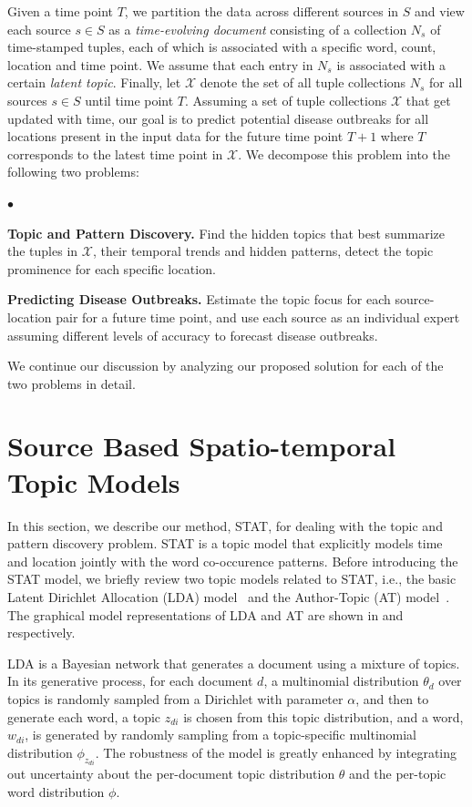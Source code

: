 \documentclass[conference]{IEEEtran}
\newcommand{\squishlist}{
   \begin{list}{$\bullet$}
    {
      \setlength{\itemsep}{0pt}
      \setlength{\parsep}{3pt}
      \setlength{\topsep}{3pt}
      \setlength{\partopsep}{0pt}
      \setlength{\leftmargin}{1.5em}
      \setlength{\labelwidth}{1em}
      \setlength{\labelsep}{0.5em} } }
\newcommand{\squishend}{
    \end{list}  }
\newcommand{\model}{{STAT}\xspace} %
\begin{document}
Given a time point $T$, we partition the data across different sources in $S$ and view each source $s \in S$ as a {\em time-evolving document} consisting of a collection $N_s$ of time-stamped tuples, each of which is associated with a specific word, count, location and time point. We assume that each entry in $N_s$ is associated with a certain {\em latent topic}. Finally, let $\mathcal{X}$ denote the set of all tuple collections $N_s$ for all sources $s \in S$ until time point $T$. Assuming a set of tuple collections $\mathcal{X}$ that get updated with time, our goal is to predict potential disease outbreaks for all locations present in the input data for the future time point $T+1$ where $T$ corresponds to the latest time point in $\mathcal{X}$.  We decompose this problem into the following two problems:
\squishlist
\item {\bf Topic and Pattern Discovery.} Find the hidden topics that best summarize the tuples in $\mathcal{X}$, their temporal trends and hidden patterns, detect the topic prominence for each specific location.
\item {\bf Predicting Disease Outbreaks.} Estimate the topic focus for each source-location pair for a future time point, and use each source as an individual expert assuming different levels of accuracy to forecast disease outbreaks.
\squishend

We continue our discussion by analyzing our proposed solution for each of the two problems in detail. 

\section{Source Based Spatio-temporal \\ Topic Models}
\label{sec:model}
In this section, we describe our method, \model, for dealing with the topic and pattern discovery problem. \model is a topic model that explicitly models time and location jointly with the word co-occurence patterns. Before introducing the \model model, we briefly review two topic models related to \model, i.e., the basic Latent Dirichlet Allocation (LDA) model~\cite{blei:2003} and the Author-Topic (AT) model~\cite{rosen:2004}. The graphical model representations of LDA and AT are shown in  and  respectively.

LDA is a Bayesian network that generates a document using a mixture of topics. In its generative process, for each document $d$, a multinomial distribution $\theta_d$ over topics is randomly sampled from a Dirichlet with parameter $\alpha$, and then to generate each word, a topic $z_{di}$ is chosen from this topic distribution, and a word, $w_{di}$, is generated by randomly sampling from a topic-specific multinomial distribution $\phi_{z_{di}}$. The robustness of the model is greatly enhanced by integrating out uncertainty about the per-document topic distribution $\theta$ and the per-topic word distribution $\phi$. 
\end{document}
